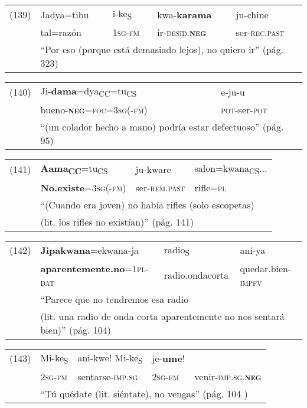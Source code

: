 {%
\begin{tabular}{lllll}
(139) & Jadya=tibu & i-ke\textsubscript{S} & kwa-\textbf{karama} & ju-chine \\
& tal=razón & \textsc{1sg-fm} & ir-\textsc{desid.\textbf{neg}} & ser-\textsc{rec.past}\\
& \multicolumn{4}{l}{``Por eso (porque está demasiado lejos), no quiero ir'' (pág. 323)}
\end{tabular} \vspace{0.5cm}

\begin{tabular}{lll}
(140) & Ji-\textbf{dama}=dya\textsubscript{CC}=tu\textsubscript{CS} & e-ju-u \\
& bueno-\textsc{\textbf{neg}=foc=3sg(-fm)} & \textsc{pot-}ser-\textsc{pot} \\
& \multicolumn{2}{l}{``(un colador hecho a mano) podría estar defectuoso'' (pág. 95)}
\end{tabular} \vspace{0.5cm}

\begin{tabular}{llll}
(141) & \textbf{Aama\textsubscript{CC}}=tu\textsubscript{CS} & ju-kware & salon=kwana\textsubscript{CS}... \\
& \textbf{No.existe}=\textsc{3sg(-fm)} & ser-\textsc{rem.past} & rifle=\textsc{pl} \\
& \multicolumn{3}{l}{``(Cuando era joven) no había rifles (solo escopetas)} \\
& \multicolumn{3}{l}{(lit. los rifles no existían)'' (pág. 141)}
\end{tabular} \vspace{0.5cm}

{\small
\begin{tabular}{llll}
(142) & \textbf{Jipakwana}=ekwana-ja & radio\textsubscript{S} & ani-ya \\
& \textbf{aparentemente.no}=\textsc{1pl-dat} & radio.ondacorta & quedar.bien-\textsc{impfv}\\
& \multicolumn{3}{l}{``Parece que no tendremos esa radio} \\
& \multicolumn{3}{l}{(lit. una radio de onda corta aparentemente no nos sentará bien)'' (pág. 104)}
\end{tabular} \vspace{0.5cm}}

\begin{tabular}{lllll}
(143) & Mi-ke\textsubscript{S} & ani-kwe! Mi-ke\textsubscript{S} & je-\textbf{ume}! \\
& \textsc{2sg-fm} & sentarse-\textsc{imp.sg} & \textsc{2sg-fm} & venir-\textsc{imp.sg.\textbf{neg}} \\
& \multicolumn{4}{l}{``Tú quédate (lit. siéntate), no vengas'' (pág. 104 )}
\end{tabular} \vspace{0.5cm}

}

